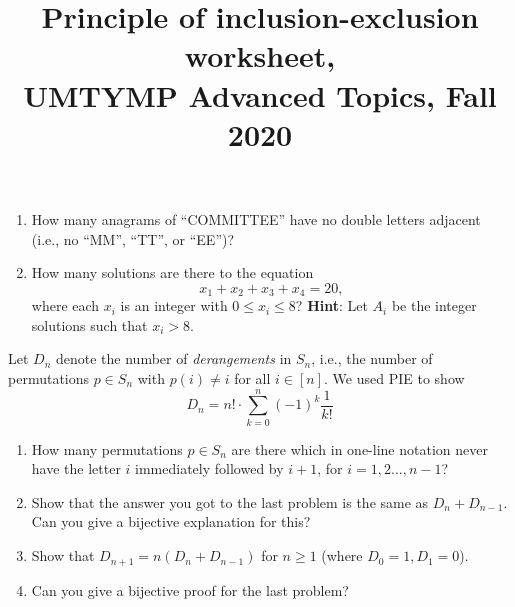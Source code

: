 \documentclass[11pt]{article}
\title{Principle of inclusion-exclusion worksheet, \\UMTYMP Advanced Topics, Fall 2020}
\date{}
\begin{document}
\maketitle

\thispagestyle{empty}



\begin{enumerate}

\item How many anagrams of ``COMMITTEE'' have no double letters adjacent (i.e., no ``MM'', ``TT'', or ``EE'')?

\item How many solutions are there to the equation
\[ x_1 + x_2 + x_3 + x_4  = 20 ,\]
where each $x_i$ is an integer with $0\leq x_i \leq 8$? {\bf Hint}: Let $A_i$ be the integer solutions such that $x_i > 8$.

\end{enumerate}

Let $D_n$ denote the number of \emph{derangements} in $S_n$, i.e., the number of permutations $p \in S_n$ with $p(i)\neq i$ for all $i\in [n]$. We used PIE to show
\[ D_n = n! \cdot \sum_{k=0}^{n} (-1)^k \frac{1}{k!}\]

\begin{enumerate}

\addtocounter{enumi}{2}

\item  How many permutations $p \in S_n$ are there which in one-line notation never have the letter $i$ immediately followed by $i+1$, for $i=1,2\ldots,n-1$? 

\item Show that the answer you got to the last problem is the same as $D_n + D_{n-1}$. Can you give a bijective explanation for this?

\item Show that $D_{n+1} = n(D_n + D_{n-1})$ for $n \geq 1$ (where $D_0=1,D_1=0$).

\item Can you give a bijective proof for the last problem?

\end{enumerate}
\end{document}
